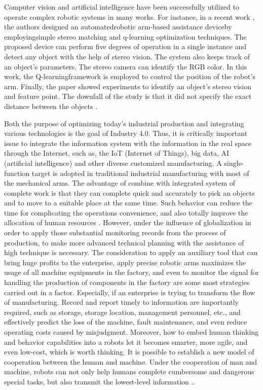 Computer  vision  and  artificial  intelligence  have  been successfully  utilized  to  operate  complex  robotic  systems  in many  works. For instance, in a recent work , the authors designed  an  automatedrobotic  arm-based  assistance deviceby employingsimple   stereo   matching   and   q-learning optimization  techniques.  The  proposed  device  can  perform five degrees of operation in a single instance and detect any object with the help of stereo vision. The system also keeps track  of  an  object's  parameters.  The  stereo  camera  can identify   the   RGB   color.   In   this   work,   the   Q-learningframework is  employed  to  control  the  position  of  the robot’s   arm.   Finally,   the   paper   showed   experiments   to identify  an  object's  stereo  vision  and  feature  point.  The downfall  of  the  study  is  that  it  did  not  specify  the  exact distance between the objects \cite{r3}.

Both the purpose of optimizing today's industrial production and integrating various
technologies is the goal of Industry 4.0. Thus, it is critically important issue to integrate the
information system with the information in the real space through the Internet, such as, the
IoT (Internet of Things), big data, AI (artificial intelligence) and other diverse customized
manufacturing. A single-function target is adopted in traditional industrial manufacturing with
most of the mechanical arms. The advantage of combine with integrated system of complete
work is that they can complete quick and accurately to pick an objects and to move to a
suitable place at the same time. Such behavior can reduce the time for complicating the
operations convenience, and also totally improve the allocation of human resources .
However, under the influence of globalization in order to apply those substantial monitoring
records from the process of production, to make more advanced technical planning with the
assistance of high technique is necessary. The consideration to apply an auxiliary tool that can
bring huge profits to the enterprise, apply precise robotic arms maximizes the usage of all
machine equipments in the factory, and even to monitor the signal for handling the production
of components in the factory are some most strategies carried out in a factor. Especially, if an
enterprise is trying to transform the flow of manufacturing. Record and report timely to
information are importantly required, such as storage, storage location, management
personnel, etc., and effectively predict the loss of the machine, fault maintenance, and even
reduce operating costs caused by misjudgment. Moreover, how to embed human thinking and
behavior capabilities into a robots let it becomes smarter, more agile, and even low-cost,
which is worth thinking. It is possible to establish a new model of cooperation between the
human and machine. Under the cooperation of man and machine, robots can not only help
humans complete cumbersome and dangerous special tasks, but also transmit the lowest-level
information .\cite{r4}.


